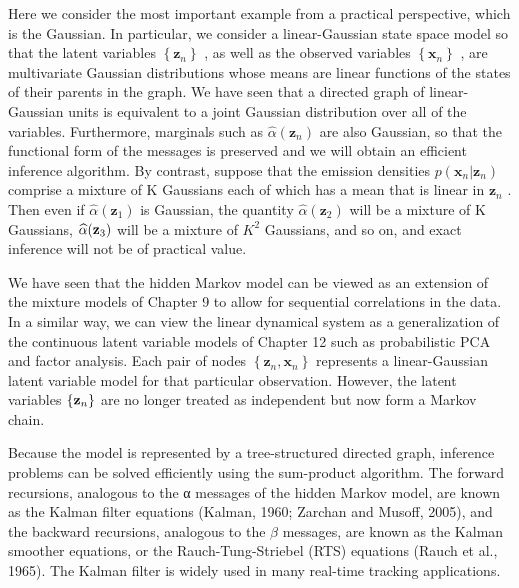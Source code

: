 \documentclass[
  10
]{article}
\begin{document}
Here we consider the most important example from a practical
perspective, which is the Gaussian. In particular, we consider a
linear-Gaussian state space model so that the latent variables
\(\left\{ \mathbf { z } _ { n } \right\}\) , as well as the observed
variables \(\left\{ \mathbf { x } _ { n } \right\}\) , are multivariate
Gaussian distributions whose means are linear functions of the states of
their parents in the graph. We have seen that a directed graph of
linear-Gaussian units is equivalent to a joint Gaussian distribution
over all of the variables. Furthermore, marginals such as
\(\widehat { \alpha } ( \mathbf { z } _ { n } )\) are also Gaussian, so
that the functional form of the messages is preserved and we will obtain
an efficient inference algorithm. By contrast, suppose that the emission
densities \(p ( \mathbf { x } _ { n } | \mathbf { z } _ { n } )\)
comprise a mixture of K Gaussians each of which has a mean that is
linear in \(\mathbf { z } _ { n }\) . Then even if
\(\widehat { \alpha } ( \mathbf { z } _ { 1 } )\) is Gaussian, the
quantity \(\widehat { \alpha } ( \mathbf { z } _ { 2 } )\) will be a
mixture of K Gaussians, \(\widehat { \alpha } ( { \bf z } _ { 3 } )\)
will be a mixture of \(K ^ { 2 }\) Gaussians, and so on, and exact
inference will not be of practical value.

We have seen that the hidden Markov model can be viewed as an extension
of the mixture models of Chapter 9 to allow for sequential correlations
in the data. In a similar way, we can view the linear dynamical system
as a generalization of the continuous latent variable models of Chapter
12 such as probabilistic PCA and factor analysis. Each pair of nodes
\(\left\{ \mathbf { z } _ { n } , \mathbf { x } _ { n } \right\}\)
represents a linear-Gaussian latent variable model for that particular
observation. However, the latent variables
\(\left\{ { { \bf { z } } _ { n } } \right\}\) are no longer treated as
independent but now form a Markov chain.

Because the model is represented by a tree-structured directed graph,
inference problems can be solved efficiently using the sum-product
algorithm. The forward recursions, analogous to the α messages of the
hidden Markov model, are known as the Kalman filter equations (Kalman,
1960; Zarchan and Musoff, 2005), and the backward recursions, analogous
to the \(\beta\) messages, are known as the Kalman smoother equations,
or the Rauch-Tung-Striebel (RTS) equations (Rauch et al., 1965). The
Kalman filter is widely used in many real-time tracking applications.
\end{document}
